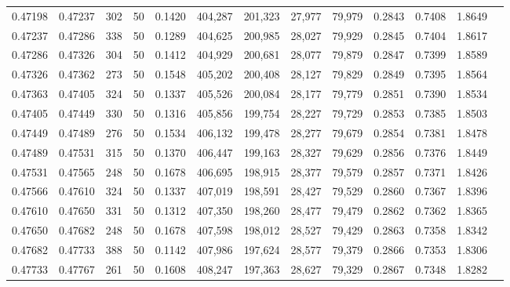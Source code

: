 \begin{tabular}{rrrrrrrrrrrrr}
0.47198 & 0.47237 &   302 &  50 &                                     0.1420 & 404,287 & 201,323 &  27,977 &  79,979 & 0.2843 & 0.7408 & 1.8649 \\
0.47237 & 0.47286 &   338 &  50 &                                     0.1289 & 404,625 & 200,985 &  28,027 &  79,929 & 0.2845 & 0.7404 & 1.8617 \\
0.47286 & 0.47326 &   304 &  50 &                                     0.1412 & 404,929 & 200,681 &  28,077 &  79,879 & 0.2847 & 0.7399 & 1.8589 \\
0.47326 & 0.47362 &   273 &  50 &                                     0.1548 & 405,202 & 200,408 &  28,127 &  79,829 & 0.2849 & 0.7395 & 1.8564 \\
0.47363 & 0.47405 &   324 &  50 &                                     0.1337 & 405,526 & 200,084 &  28,177 &  79,779 & 0.2851 & 0.7390 & 1.8534 \\
0.47405 & 0.47449 &   330 &  50 &                                     0.1316 & 405,856 & 199,754 &  28,227 &  79,729 & 0.2853 & 0.7385 & 1.8503 \\
0.47449 & 0.47489 &   276 &  50 &                                     0.1534 & 406,132 & 199,478 &  28,277 &  79,679 & 0.2854 & 0.7381 & 1.8478 \\
0.47489 & 0.47531 &   315 &  50 &                                     0.1370 & 406,447 & 199,163 &  28,327 &  79,629 & 0.2856 & 0.7376 & 1.8449 \\
0.47531 & 0.47565 &   248 &  50 &                                     0.1678 & 406,695 & 198,915 &  28,377 &  79,579 & 0.2857 & 0.7371 & 1.8426 \\
0.47566 & 0.47610 &   324 &  50 &                                     0.1337 & 407,019 & 198,591 &  28,427 &  79,529 & 0.2860 & 0.7367 & 1.8396 \\
0.47610 & 0.47650 &   331 &  50 &                                     0.1312 & 407,350 & 198,260 &  28,477 &  79,479 & 0.2862 & 0.7362 & 1.8365 \\
0.47650 & 0.47682 &   248 &  50 &                                     0.1678 & 407,598 & 198,012 &  28,527 &  79,429 & 0.2863 & 0.7358 & 1.8342 \\
0.47682 & 0.47733 &   388 &  50 &                                     0.1142 & 407,986 & 197,624 &  28,577 &  79,379 & 0.2866 & 0.7353 & 1.8306 \\
0.47733 & 0.47767 &   261 &  50 &                                     0.1608 & 408,247 & 197,363 &  28,627 &  79,329 & 0.2867 & 0.7348 & 1.8282 \\

\end{tabular}
